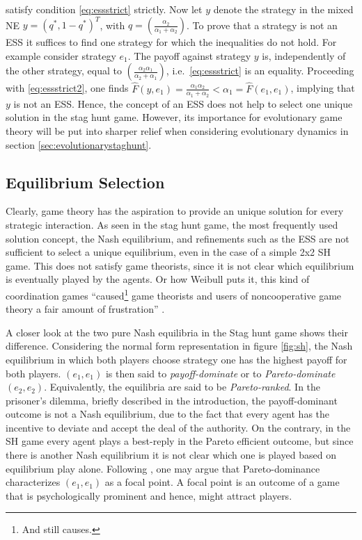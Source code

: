 satisfy condition \eqref{eq:essstrict} strictly. 
Now let $y$ denote the strategy in the mixed NE $y=(q^*,1-q^*)^T$, 
with $q=\left(\frac{\alpha_2}{\alpha_1+\alpha_2}\right)$.
To prove that a strategy is not an ESS it suffices to find one
strategy for which the inequalities do not hold.
For example consider strategy $e_1$.
The payoff against strategy $y$ is, independently of the other strategy, 
equal to $\left(\frac{\alpha_2 \alpha_1}{\alpha_2+\alpha_1}\right)$, i.e.\ 
\eqref{eq:essstrict} is an equality.
Proceeding with \eqref{eq:essstrict2}, one finds
$\hat{F}(y,e_1) = \frac{\alpha_1 \alpha_2}{\alpha_1+\alpha_2}
< \alpha_1 = \hat{F}(e_1,e_1)$, implying that $y$ is not an ESS.
Hence, the concept of an ESS does not help to select one 
unique solution in the stag hunt game. However, its importance for
evolutionary game theory will be put into sharper relief when considering
evolutionary dynamics in section \ref{sec:evolutionarystaghunt}. 


\subsection{Equilibrium Selection}
\label{sec:equilibriumselection}
Clearly, game theory has the aspiration to provide an unique solution for 
every strategic interaction.
As seen in the stag hunt game, the most frequently used solution concept, 
the Nash equilibrium, and refinements such as the ESS are
not sufficient to select a unique equilibrium, even in the case of a simple
2x2 SH game. This does not satisfy game theorists, since it is not clear which
equilibrium is eventually played by the agents. Or how 
Weibull puts it, this kind of coordination games 
``caused\footnote{And still causes.} game theorists and users of 
noncooperative game theory a fair amount of frustration'' 
\parencite[30]{weibull_evolutionary_1997}. 

A closer look at the two pure Nash equilibria in the Stag hunt game 
shows their difference. Considering the normal form representation in figure 
\ref{fig:sh}, the Nash equilibrium in which both players choose strategy one 
has the highest payoff
for both players. $(e_1,e_1)$ is then said to 
\textit{payoff-dominate} or to \textit{Pareto-dominate} 
$(e_2,e_2)$. Equivalently, the equilibria are said to be
\textit{Pareto-ranked}.
In the prisoner's dilemma, briefly described in the introduction, 
the payoff-dominant outcome is not a 
Nash equilibrium, due to the fact that every agent has the incentive to 
deviate and accept the deal of the authority.
On the contrary, in the SH game every agent plays a best-reply 
in the Pareto efficient outcome, but since there is another Nash equilibrium 
it is not clear which one is played based on equilibrium play alone. 
Following \textcite[57]{schelling_strategy_1960}, one may argue that 
Pareto-dominance characterizes $(e_1,e_1)$ as a focal point. 
A focal point is an outcome of a game that is psychologically prominent and
hence, might attract players.

